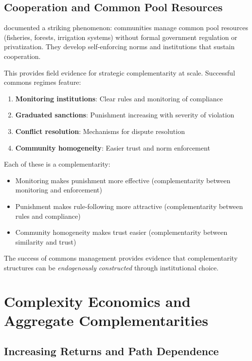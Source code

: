 \documentclass[12pt,oneside]{book}
\begin{document}
\section{Cooperation and Common Pool Resources}

\citet{ostrom1990} documented a striking phenomenon: communities manage common pool resources
(fisheries, forests, irrigation systems) without formal government regulation or privatization.
They develop self-enforcing norms and institutions that sustain cooperation.

This provides field evidence for strategic complementarity at scale. Successful commons regimes
feature:

\begin{enumerate}
  \item \textbf{Monitoring institutions}: Clear rules and monitoring of compliance
  \item \textbf{Graduated sanctions}: Punishment increasing with severity of violation
  \item \textbf{Conflict resolution}: Mechanisms for dispute resolution
  \item \textbf{Community homogeneity}: Easier trust and norm enforcement
\end{enumerate}

Each of these is a complementarity:
\begin{itemize}
  \item Monitoring makes punishment more effective (complementarity between monitoring and enforcement)
  \item Punishment makes rule-following more attractive (complementarity between rules and compliance)
  \item Community homogeneity makes trust easier (complementarity between similarity and trust)
\end{itemize}

The success of commons management provides evidence that complementarity structures can be
\emph{endogenously constructed} through institutional choice.

\chapter{Complexity Economics and Aggregate Complementarities}
\label{sec:complexity}

\section{Increasing Returns and Path Dependence}
\end{document}
